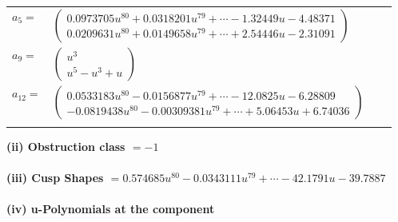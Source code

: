 \documentclass[1p]{elsarticle_modified}
\theoremstyle{definition}
\begin{document}
\begin{tabular}{m{7pt} m{180pt} m{7pt} m{180pt} }
\flushright $a_{5}=$&$\begin{pmatrix}0.0973705 u^{80}+0.0318201 u^{79}+\cdots-1.32449 u-4.48371\\0.0209631 u^{80}+0.0149658 u^{79}+\cdots+2.54446 u-2.31091\end{pmatrix}$ \\
\flushright $a_{9}=$&$\begin{pmatrix}u^3\\u^5- u^3+u\end{pmatrix}$ \\
\flushright $a_{12}=$&$\begin{pmatrix}0.0533183 u^{80}-0.0156877 u^{79}+\cdots-12.0825 u-6.28809\\-0.0819438 u^{80}-0.00309381 u^{79}+\cdots+5.06453 u+6.74036\end{pmatrix}$\\&\end{tabular}
\flushleft \textbf{(ii) Obstruction class $= -1$}\\~\\
\flushleft \textbf{(iii) Cusp Shapes $= 0.574685 u^{80}-0.0343111 u^{79}+\cdots-42.1791 u-39.7887$}\\~\\
\newpage\renewcommand{\arraystretch}{1}
\flushleft \textbf{(iv) u-Polynomials at the component}\newline \\
\end{document}
